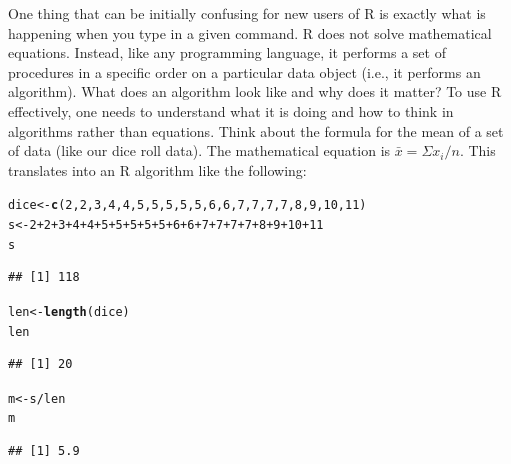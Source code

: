 \documentclass[12pt]{article}\usepackage[]{graphicx}\usepackage[]{color}
\makeatletter
\newcommand{\hlnum}[1]{\textcolor[rgb]{0.686,0.059,0.569}{#1}}%
\newcommand{\hlopt}[1]{\textcolor[rgb]{0,0,0}{#1}}%
\newcommand{\hlstd}[1]{\textcolor[rgb]{0.345,0.345,0.345}{#1}}%
\newcommand{\hlkwb}[1]{\textcolor[rgb]{0.69,0.353,0.396}{#1}}%
\newcommand{\hlkwd}[1]{\textcolor[rgb]{0.737,0.353,0.396}{\textbf{#1}}}%
\newenvironment{kframe}{%
 \def\at@end@of@kframe{}%
 \ifinner\ifhmode%
  \def\at@end@of@kframe{\end{minipage}}%
  \begin{minipage}{\columnwidth}%
 \fi\fi%
 \def\FrameCommand##1{\hskip\@totalleftmargin \hskip-\fboxsep
 \colorbox{shadecolor}{##1}\hskip-\fboxsep
     \hskip-\linewidth \hskip-\@totalleftmargin \hskip\columnwidth}%
 \MakeFramed {\advance\hsize-\width
   \@totalleftmargin\z@ \linewidth\hsize
   \@setminipage}}%
 {\par\unskip\endMakeFramed%
 \at@end@of@kframe}
\newenvironment{knitrout}{}{} %
\makeatother
\begin{document}
One thing that can be initially confusing for new users of R is exactly what is happening when you type in a given command. R does not solve mathematical equations. Instead, like any programming language, it performs a set of procedures in a specific order on a particular data object (i.e., it performs an algorithm). What does an algorithm look like and why does it matter? To use R effectively, one needs to understand what it is doing and how to think in algorithms rather than equations. Think about the formula for the mean of a set of data (like our dice roll data). The mathematical equation is $\bar{x}=\Sigma x_{i} / n$. This translates into an R algorithm like the following:
\begin{knitrout}
\color{fgcolor}\begin{kframe}
\begin{alltt}
\hlstd{dice} \hlkwb{<-} \hlkwd{c}\hlstd{(}\hlnum{2}\hlstd{,}\hlnum{2}\hlstd{,}\hlnum{3}\hlstd{,}\hlnum{4}\hlstd{,}\hlnum{4}\hlstd{,}\hlnum{5}\hlstd{,}\hlnum{5}\hlstd{,}\hlnum{5}\hlstd{,}\hlnum{5}\hlstd{,}\hlnum{5}\hlstd{,}\hlnum{6}\hlstd{,}\hlnum{6}\hlstd{,}\hlnum{7}\hlstd{,}\hlnum{7}\hlstd{,}\hlnum{7}\hlstd{,}\hlnum{7}\hlstd{,}\hlnum{8}\hlstd{,}\hlnum{9}\hlstd{,}\hlnum{10}\hlstd{,}\hlnum{11}\hlstd{)}
\hlstd{s} \hlkwb{<-} \hlnum{2}\hlopt{+}\hlnum{2}\hlopt{+}\hlnum{3}\hlopt{+}\hlnum{4}\hlopt{+}\hlnum{4}\hlopt{+}\hlnum{5}\hlopt{+}\hlnum{5}\hlopt{+}\hlnum{5}\hlopt{+}\hlnum{5}\hlopt{+}\hlnum{5}\hlopt{+}\hlnum{6}\hlopt{+}\hlnum{6}\hlopt{+}\hlnum{7}\hlopt{+}\hlnum{7}\hlopt{+}\hlnum{7}\hlopt{+}\hlnum{7}\hlopt{+}\hlnum{8}\hlopt{+}\hlnum{9}\hlopt{+}\hlnum{10}\hlopt{+}\hlnum{11}
\hlstd{s}
\end{alltt}
\begin{verbatim}
## [1] 118
\end{verbatim}
\begin{alltt}
\hlstd{len} \hlkwb{<-} \hlkwd{length}\hlstd{(dice)}
\hlstd{len}
\end{alltt}
\begin{verbatim}
## [1] 20
\end{verbatim}
\begin{alltt}
\hlstd{m} \hlkwb{<-} \hlstd{s}\hlopt{/}\hlstd{len}
\hlstd{m}
\end{alltt}
\begin{verbatim}
## [1] 5.9
\end{verbatim}
\end{kframe}
\end{knitrout}
\end{document}
